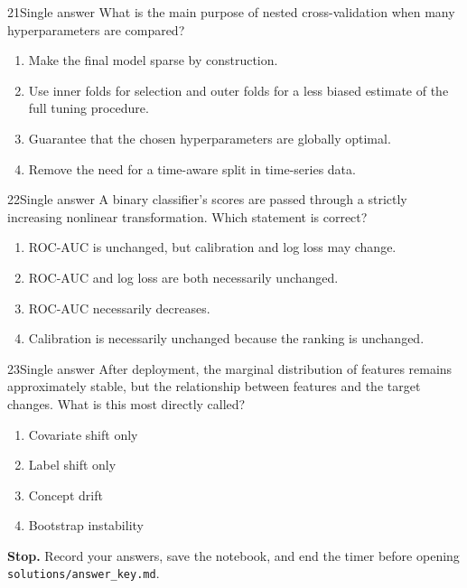 \documentclass[10pt,a4paper]{article}
\begin{document}
\begin{questionbox}{21}{Single answer}
What is the main purpose of nested cross-validation when many hyperparameters are compared?
\begin{enumerate}
  \item Make the final model sparse by construction.
  \item Use inner folds for selection and outer folds for a less biased estimate of the full tuning procedure.
  \item Guarantee that the chosen hyperparameters are globally optimal.
  \item Remove the need for a time-aware split in time-series data.
\end{enumerate}
\end{questionbox}

\begin{questionbox}{22}{Single answer}
A binary classifier's scores are passed through a strictly increasing nonlinear transformation. Which statement is correct?
\begin{enumerate}
  \item ROC-AUC is unchanged, but calibration and log loss may change.
  \item ROC-AUC and log loss are both necessarily unchanged.
  \item ROC-AUC necessarily decreases.
  \item Calibration is necessarily unchanged because the ranking is unchanged.
\end{enumerate}
\end{questionbox}

\begin{questionbox}{23}{Single answer}
After deployment, the marginal distribution of features remains approximately stable, but the relationship between features and the target changes. What is this most directly called?
\begin{enumerate}
  \item Covariate shift only
  \item Label shift only
  \item Concept drift
  \item Bootstrap instability
\end{enumerate}
\end{questionbox}

\vfill
\begin{notebox}
\textbf{Stop.} Record your answers, save the notebook, and end the timer before opening \texttt{solutions/answer\_key.md}.
\end{notebox}
\end{document}
